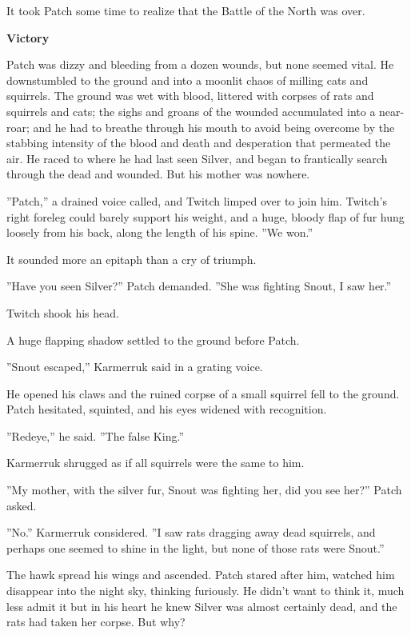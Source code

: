 \documentclass[11pt]{article}
\begin{document}
It took Patch some time to realize that the Battle of the North was over.\par
\par
{\bf Victory\par
}\par
 Patch was dizzy and bleeding from a dozen wounds, but none seemed vital. He downstumbled to the ground and into a moonlit chaos of milling cats and squirrels. The ground was wet with blood, littered with corpses of rats and squirrels and cats; the sighs and groans of the wounded accumulated into a near-roar; and he had to breathe through his mouth to avoid being overcome by the stabbing intensity of the blood and death and desperation that permeated the air. He raced to where he had last seen Silver, and began to frantically search through the dead and wounded. But his mother was nowhere.\par
 ''Patch,'' a drained voice called, and Twitch limped over to join him. Twitch's right foreleg could barely support his weight, and a huge, bloody flap of fur hung loosely from his back, along the length of his spine. ''We won.''\par
 It sounded more an epitaph than a cry of triumph.\par
 ''Have you seen Silver?'' Patch demanded. ''She was fighting Snout, I saw her.''\par
 Twitch shook his head.\par
 A huge flapping shadow settled to the ground before Patch.\par
 ''Snout escaped,'' Karmerruk said in a grating voice.\par
 He opened his claws and the ruined corpse of a small squirrel fell to the ground. Patch hesitated, squinted, and his eyes widened with recognition.\par
 ''Redeye,'' he said. ''The false King.''\par
 Karmerruk shrugged as if all squirrels were the same to him.\par
 ''My mother, with the silver fur, Snout was fighting her, did you see her?'' Patch asked.\par
 ''No.'' Karmerruk considered. ''I saw rats dragging away dead squirrels, and perhaps one seemed to shine in the light, but none of those rats were Snout.''\par
 The hawk spread his wings and ascended. Patch stared after him, watched him disappear into the night sky, thinking furiously. He didn't want to think it, much less admit it %
 but in his heart he knew Silver was almost certainly dead, and the rats had taken her corpse. But why?\par
\end{document}
